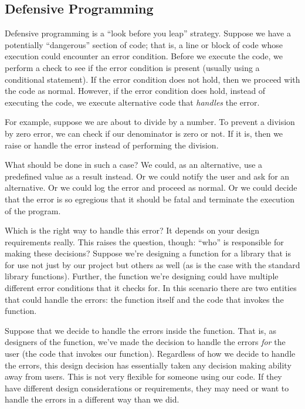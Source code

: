 \subsection{Defensive Programming}

Defensive programming is a ``look before you leap'' strategy.
Suppose we have a potentially ``dangerous'' section of code; 
that is, a line or block of code whose execution could encounter
an error condition.  Before we execute the code, we perform
a check to see if the error condition is present (usually using
a conditional statement).  If the error condition does not hold, 
then we proceed with the code as normal.  However, if the
error condition does hold, instead of executing the code, we
execute alternative code that \emph{handles} the error.

For example, suppose we are about to divide by a number.
To prevent a division by zero error, we can check if our
denominator is zero or not.  If it is, then we raise or handle
the error instead of performing the division.  

What should be done in such a case?  We could, as an 
alternative, use a predefined value as a result instead.  Or 
we could notify the user and ask for an alternative.  Or we
could log the error and proceed as normal.  Or we could 
decide that the error is so egregious that it should be fatal
and terminate the execution of the program.

Which is the right way to handle this error?  It depends on 
your design requirements really.  This raises the question, 
though: ``who'' is responsible for making these decisions?
Suppose we're designing a function for a library that is 
for use not just by our project but others as well (as is the
case with the standard library functions).  Further, the
function we're designing could have multiple different 
error conditions that it checks for.  In this scenario there
are two entities that could handle the errors: the function
itself and the code that invokes the function.

Suppose that we decide to handle the errors inside the 
function.  That is, as designers of the function, we've made
the decision to handle the errors \emph{for} the user (the
code that invokes our function).  Regardless of how we
decide to handle the errors, this design decision has
essentially taken any decision making ability away from 
users.  This is not very flexible for someone using our 
code.  If they have different design considerations or
requirements, they may need or want to handle the errors
in a different way than we did.  

